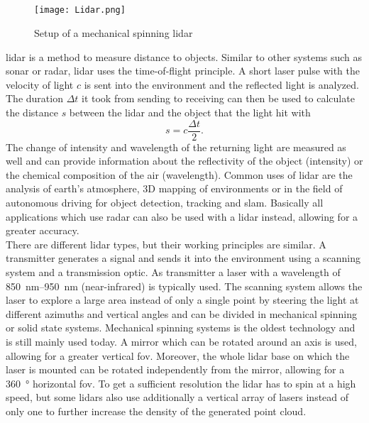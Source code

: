 \subsection{}
\begin{figure}[htb]
	\centering
	\texttt{[image: Lidar.png]}
	\caption{Setup of a mechanical spinning \acrshort{lidar} \cite{Li2020}}
	\label{fig:lidar}
\end{figure}
\gls{lidar} is a method to measure distance to objects.
Similar to other systems such as \gls{sonar} or \gls{radar}, \gls{lidar} uses the time-of-flight principle.
A short laser pulse with the velocity of light $c$ is sent into the environment and the reflected light is analyzed.
The duration $\Delta t$ it took from sending to receiving can then be used to calculate the distance $s$ between the \gls{lidar} and the object that the light hit with
\begin{equation}
	s = c\frac{\Delta t}{2}.
\end{equation}
The change of intensity and wavelength of the returning light are measured as well and can provide information about the reflectivity of the object (intensity) or the chemical composition of the air (wavelength).
Common uses of \gls{lidar} are the analysis of earth's atmosphere, 3D mapping of environments or in the field of autonomous driving for object detection, tracking and \gls{slam}.
Basically all applications which use \gls{radar} can also be used with a \gls{lidar} instead, allowing for a greater accuracy.\\
There are different \gls{lidar} types, but their working principles are similar.
A transmitter generates a signal and sends it into the environment using a scanning system and a transmission optic.
As transmitter a laser with a wavelength of \SIrange{850}{950}{\nano\metre} (near-infrared) is typically used.
The scanning system allows the laser to explore a large area instead of only a single point by steering the light at different azimuths and vertical angles and can be divided in mechanical spinning or solid state systems.
Mechanical spinning systems is the oldest technology and is still mainly used today.
A mirror which can be rotated around an axis is used, allowing for a greater vertical \gls{fov}.
Moreover, the whole \gls{lidar} base on which the laser is mounted can be rotated independently from the mirror, allowing for a \SI{360}{\degree} horizontal \gls{fov}.
To get a sufficient resolution the \gls{lidar} has to spin at a high speed, but some \gls{lidar}s also use additionally a vertical array of lasers instead of only one to further increase the density of the generated point cloud.
